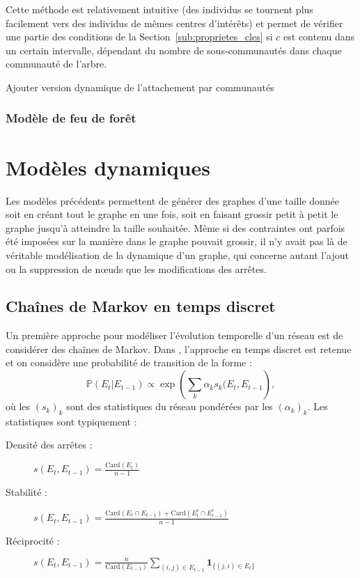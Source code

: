 \documentclass[a4paper]{article}
\newcommand{\card}[1]{\mathrm{Card}\left( #1 \right)}
\begin{document}
    Cette méthode est relativement intuitive (des individus se tournent plus
    facilement vers des individus de mêmes centres d'intérêts) et permet de
    vérifier une partie des conditions de la Section~\ref{sub:proprietes_cles}
    si $c$ est contenu dans un certain intervalle, dépendant du nombre de
    sous-communautés dans chaque communauté de l'arbre.
\begin{todo}
Ajouter version dynamique de l'attachement par communautés
\end{todo}

    \subsubsection{Modèle de feu de forêt}

    \section{Modèles dynamiques}
    \label{sec:modeles_dynamiques}
    Les modèles précédents permettent de générer des graphes d'une taille
    donnée soit en créant tout le graphe en une fois, soit en faisant grossir
    petit à petit le graphe jusqu'à atteindre la taille souhaitée. Même si
    des contraintes ont parfois été imposées sur la manière dans le graphe
    pouvait grossir, il n'y avait pas là de véritable modélisation de la
    dynamique d'un graphe, qui concerne autant l'ajout ou la suppression de
    n\oe{}uds que les modifications des arrêtes.

    \subsection{Chaînes de Markov en temps discret}
    \label{sub:markov_discret}
    Un première approche pour modéliser l'évolution temporelle d'un réseau est
    de considérer des chaînes de Markov. Dans \cite{blei2007statistical},
    l'approche en temps discret est retenue et on considère une probabilité de
    transition de la forme :
    \[
        \mathbb{P}(E_t | E_{t-1}) \propto \exp \left( \sum_k \alpha_k s_k(E_t, E_{t-1} \right),
    \]
    où les $(s_k)_k$ sont des statistiques du réseau pondérées par les $(\alpha_k)_k$.
    Les statistiques sont typiquement :
    \begin{description}
        \item[Densité des arrêtes :] $s(E_t, E_{t-1}) = \frac{\card{E_t}}{n-1}$
        \item[Stabilité :] $s(E_t, E_{t-1}) = \frac{\card{E_t \cap E_{t-1}} + \card{E_t^c \cap E_{t-1}^c}}{n-1}$
        \item[Réciprocité :] $s(E_t, E_{t-1}) = \frac{n}{\card{E_{t-1}}} \sum_{(i,j) \in E_{t-1}} \mathbf{1}_{\{(j,i) \in E_t\}}$
    \end{description}



\end{document}
